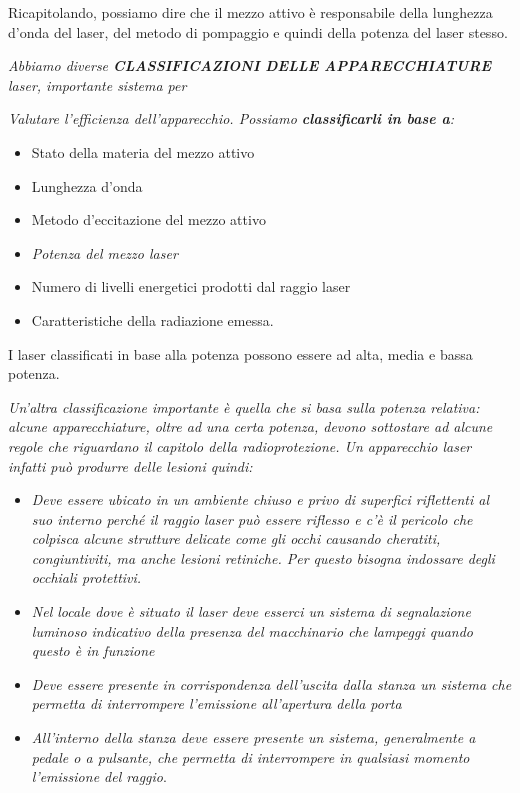 Ricapitolando, possiamo dire che il mezzo attivo è responsabile della
lunghezza d'onda del laser, del metodo di pompaggio e quindi della
potenza del laser stesso.

\emph{Abbiamo diverse \textbf{CLASSIFICAZIONI DELLE APPARECCHIATURE}
laser, importante sistema per}

\emph{Valutare l'efficienza dell'apparecchio. Possiamo
\textbf{classificarli in base a}:}

\begin{itemize}
\item
  Stato della materia del mezzo attivo
\item
  Lunghezza d'onda
\item
  Metodo d'eccitazione del mezzo attivo
\item
  \emph{Potenza del mezzo laser}
\item
  Numero di livelli energetici prodotti dal raggio laser
\item
  Caratteristiche della radiazione emessa.
\end{itemize}

I laser classificati in base alla potenza possono essere ad alta, media
e bassa potenza.

\emph{Un'altra classificazione importante è quella che si basa sulla
\emph{potenza relativa}: alcune apparecchiature, oltre ad una certa
potenza, devono sottostare ad alcune regole che riguardano il capitolo
della radioprotezione. Un apparecchio laser infatti può produrre delle
lesioni quindi:}

\begin{itemize}
\item
  \emph{Deve essere ubicato in un ambiente chiuso e privo di superfici
  riflettenti al suo interno perché il raggio laser può essere riflesso
  e c'è il pericolo che colpisca alcune strutture delicate come gli
  occhi causando cheratiti, congiuntiviti, ma anche lesioni retiniche.
  Per questo bisogna indossare degli occhiali protettivi.}
\item
  \emph{Nel locale dove è situato il laser deve esserci un sistema di
  segnalazione luminoso indicativo della presenza del macchinario che
  lampeggi quando questo è in funzione}
\item
  \emph{Deve essere presente in corrispondenza dell'uscita dalla stanza
  un sistema che permetta di interrompere l'emissione all'apertura della
  porta}
\item
  \emph{All'interno della stanza deve essere presente un sistema,
  generalmente a pedale o a pulsante, che permetta di interrompere in
  qualsiasi momento l'emissione del raggio}.
\end{itemize}

